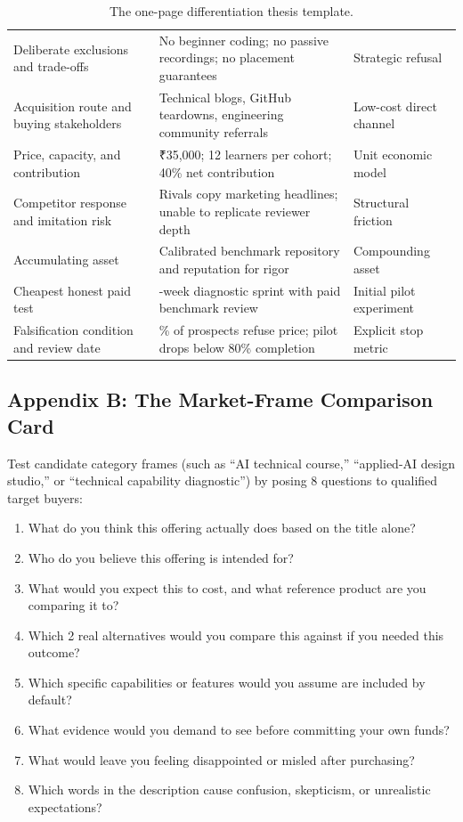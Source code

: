 \begin{table}[t]
\begin{tabularx}{\textwidth}{>{\raggedright\arraybackslash}p{5.5cm} >{\raggedright\arraybackslash}X >{\raggedright\arraybackslash}p{4cm}}
Deliberate exclusions and trade-offs & No beginner coding; no passive recordings; no placement guarantees & Strategic refusal \\
Acquisition route and buying stakeholders & Technical blogs, GitHub teardowns, engineering community referrals & Low-cost direct channel \\
Price, capacity, and contribution & ₹35,000; 12 learners per cohort; 40\% net contribution & Unit economic model \\
Competitor response and imitation risk & Rivals copy marketing headlines; unable to replicate reviewer depth & Structural friction \\
Accumulating asset & Calibrated benchmark repository and reputation for rigor & Compounding asset \\
Cheapest honest paid test & 3-week diagnostic sprint with paid benchmark review & Initial pilot experiment \\
Falsification condition and review date & 60\% of prospects refuse price; pilot drops below 80\% completion & Explicit stop metric \\
\bottomrule
\end{tabularx}
\caption{The one-page differentiation thesis template.}
\label{tab:ch8-app-thesis}
\end{table}

\subsection*{Appendix B: The Market-Frame Comparison Card}

Test candidate category frames (such as ``AI technical course,'' ``applied-AI design studio,'' or ``technical capability diagnostic'') by posing 8 questions to qualified target buyers:

\begin{enumerate}
    \item What do you think this offering actually does based on the title alone?
    \item Who do you believe this offering is intended for?
    \item What would you expect this to cost, and what reference product are you comparing it to?
    \item Which 2 real alternatives would you compare this against if you needed this outcome?
    \item Which specific capabilities or features would you assume are included by default?
    \item What evidence would you demand to see before committing your own funds?
    \item What would leave you feeling disappointed or misled after purchasing?
    \item Which words in the description cause confusion, skepticism, or unrealistic expectations?
\end{enumerate}

